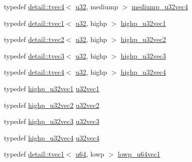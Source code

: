 \begin{DoxyCompactItemize}
\item 
typedef \hyperlink{structglm_1_1detail_1_1tvec4}{detail\+::tvec4}$<$ \hyperlink{group__gtc__type__precision_ga54e837745059fd29017bed71cfa0a8db}{u32}, mediump $>$ \hyperlink{group__gtc__type__precision_ga532f59ac4c36a7e1371341165f7be33b}{mediump\+\_\+u32vec4}
\item 
typedef \hyperlink{structglm_1_1detail_1_1tvec1}{detail\+::tvec1}$<$ \hyperlink{group__gtc__type__precision_ga54e837745059fd29017bed71cfa0a8db}{u32}, highp $>$ \hyperlink{group__gtc__type__precision_ga8a92d1f79e2fd4a03be803e35aac8e1b}{highp\+\_\+u32vec1}
\item 
typedef \hyperlink{structglm_1_1detail_1_1tvec2}{detail\+::tvec2}$<$ \hyperlink{group__gtc__type__precision_ga54e837745059fd29017bed71cfa0a8db}{u32}, highp $>$ \hyperlink{group__gtc__type__precision_gaddb81e8e12bd640e188744ed372c95bb}{highp\+\_\+u32vec2}
\item 
typedef \hyperlink{structglm_1_1detail_1_1tvec3}{detail\+::tvec3}$<$ \hyperlink{group__gtc__type__precision_ga54e837745059fd29017bed71cfa0a8db}{u32}, highp $>$ \hyperlink{group__gtc__type__precision_gab1e386f5e415e00f800edf5d15207286}{highp\+\_\+u32vec3}
\item 
typedef \hyperlink{structglm_1_1detail_1_1tvec4}{detail\+::tvec4}$<$ \hyperlink{group__gtc__type__precision_ga54e837745059fd29017bed71cfa0a8db}{u32}, highp $>$ \hyperlink{group__gtc__type__precision_ga9418a8d549d344d4f7b7158771a2fdfe}{highp\+\_\+u32vec4}
\item 
typedef \hyperlink{group__gtc__type__precision_ga8a92d1f79e2fd4a03be803e35aac8e1b}{highp\+\_\+u32vec1} \hyperlink{group__gtc__type__precision_gac8263c8c0bb36bc5c3d109f508e0fb41}{u32vec1}
\item 
typedef \hyperlink{group__gtc__type__precision_gaddb81e8e12bd640e188744ed372c95bb}{highp\+\_\+u32vec2} \hyperlink{group__gtc__type__precision_gaa543e17450ca67dee12e2c41badfb3a7}{u32vec2}
\item 
typedef \hyperlink{group__gtc__type__precision_gab1e386f5e415e00f800edf5d15207286}{highp\+\_\+u32vec3} \hyperlink{group__gtc__type__precision_ga7c88634a005904a441cba739d7cc4055}{u32vec3}
\item 
typedef \hyperlink{group__gtc__type__precision_ga9418a8d549d344d4f7b7158771a2fdfe}{highp\+\_\+u32vec4} \hyperlink{group__gtc__type__precision_ga7e4574f8327a2f576baf2617343d0170}{u32vec4}
\item 
typedef \hyperlink{structglm_1_1detail_1_1tvec1}{detail\+::tvec1}$<$ \hyperlink{group__gtc__type__precision_ga71cedd4972f9cb1a5e14dfe5ab83ecd7}{u64}, lowp $>$ \hyperlink{group__gtc__type__precision_gacd97dc5e92d0e2f6f6d62a5160508e2a}{lowp\+\_\+u64vec1}

\end{DoxyCompactItemize}
